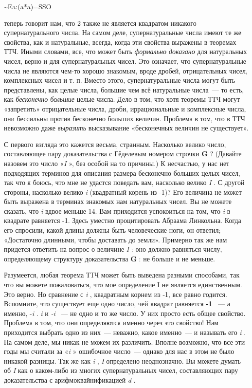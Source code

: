 \documentclass[../main.tex]{subfiles}
\begin{document}
\textasciitilde Ea:(a*a)=SSO

теперь говорит нам, что 2 также не является квадратом никакого супернатурального числа. На самом деле, супернатуральные числа имеют те же свойства, как и натуральные, всегда, когда эти свойства выражены в теоремах ТТЧ. Иными словами, все, что может быть \emph{формально доказано} для натуральных чисел, верно и для супернатуральных чисел. Это означает, что супернатуральные числа не являются чем-то хорошо знакомым, вроде дробей, отрицательных чисел, комплексных чисел и т. п. Вместо этого, супернатуральные числа могут быть представлены, как целые числа, большие чем всё натуральные числа~--- то есть, как \emph{бесконечно большие} целые числа. Дело в том, что хотя теоремы ТТЧ могут «запретить» отрицательные числа, дроби, иррациональные и комплексные числа, они бессильны против бесконечно больших величин. Проблема в том, что в ТТЧ невозможно даже \emph{выразить} высказывание «бесконечных величин не существует».

С первого взгляда это кажется весьма, странным. Насколько велико число, составляющее пару доказательства с Гёделевым номером строчки \textbf{G} ? (Давайте назовем это число «\emph{I} », без особой на то причины.) К несчастью, у нас нет подходящих терминов для описания размера бесконечно больших целых чисел, так что я боюсь, что мне не удастся поведать вам, насколько велико \emph{I} . С другой стороны, насколько велико \emph{i} (квадратный корень из -1)? Его величина не может быть выражена в терминах знакомых нам натуральных чисел. Вы не можете сказать, что \emph{i} вдвое меньше 14. Вам приходится успокоиться на том, что \emph{i} в квадрате равняется -1. Здесь уместно процитировать Абраама Линкольна. Когда его спросили, какой длины должны быть человеческие ноги, он ответил; «Достаточно длинными, чтобы доставать до земли». Примерно так же нам придется ответить на вопрос о величине \emph{I} : оно должно равняться числу, определяющему структуру доказательства \textbf{G} : не больше и не меньше.

Разумеется, любая теорема ТТЧ может быть выведена разными способами, так что вы можете пожаловаться, что мое определение I не является единственным. Это верно. Но сравнение с \emph{i} , квадратным корнем из -1, все равно годится. Вспомните, что существует еще одно число, чей квадрат равняется \textbf{-1} ~--- а именно, -\emph{i} . \emph{i} и \emph{-i} ~--- не одно и то же число. У них просто есть общее свойство. Проблема в том, что они определяются именно через это свойство! Нам приходится выбрать одно из них~--- неважно, какое именно~--- и называть его \emph{i} . На самом деле, мы никак не можем их различить. Вполне возможно, что все эти годы мы считали за «\emph{i} » ошибочное число~--- однако для нас в этом не было никакой разницы. Так же как \emph{i} , \emph{I} определено неоднозначно. Вы можете думать об \emph{I} как о каком-либо из многих супернатуральных чисел, составляющих пару доказательства с арифмоквайнификацией \emph{d} .
\end{document}
